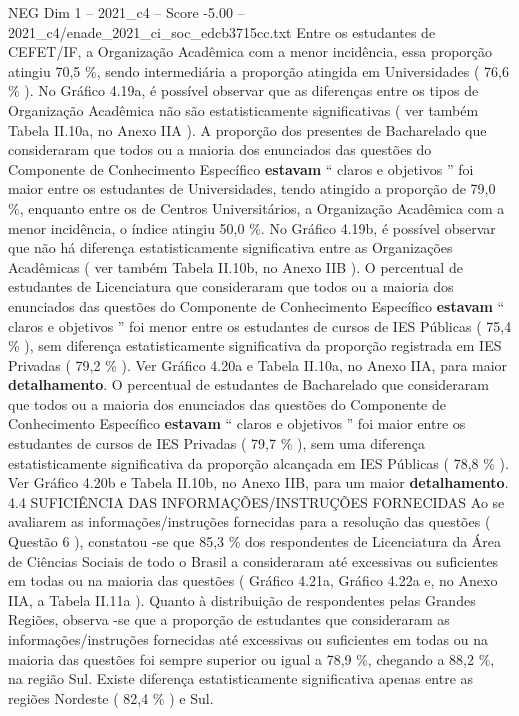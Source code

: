 \begin{textsample}{NEG Dim 1 – 2021\_c4 – Score -5.00 – 2021\_c4/enade\_2021\_ci\_soc\_edcb3715cc.txt}
Entre os estudantes de CEFET/IF, a Organização Acadêmica com a menor incidência, essa proporção atingiu 70,5 \%, sendo intermediária a proporção atingida em Universidades ( 76,6 \% ).
No Gráfico 4.19a, é possível observar que as diferenças entre os tipos de Organização Acadêmica não são estatisticamente significativas ( ver também Tabela II.10a, no Anexo IIA ).
A proporção dos presentes de Bacharelado que consideraram que todos ou a maioria dos enunciados das questões do Componente de Conhecimento Específico \textbf{estavam} “ claros e objetivos ” foi maior entre os estudantes de Universidades, tendo atingido a proporção de 79,0 \%, enquanto entre os de Centros Universitários, a Organização Acadêmica com a menor incidência, o índice atingiu 50,0 \%.
No Gráfico 4.19b, é possível observar que não há diferença estatisticamente significativa entre as Organizações Acadêmicas ( ver também Tabela II.10b, no Anexo IIB ).
O percentual de estudantes de Licenciatura que consideraram que todos ou a maioria dos enunciados das questões do Componente de Conhecimento Específico \textbf{estavam} “ claros e objetivos ” foi menor entre os estudantes de cursos de IES Públicas ( 75,4 \% ), sem diferença estatisticamente significativa da proporção registrada em IES Privadas ( 79,2 \% ).
Ver Gráfico 4.20a e Tabela II.10a, no Anexo IIA, para maior \textbf{detalhamento}.
O percentual de estudantes de Bacharelado que consideraram que todos ou a maioria dos enunciados das questões do Componente de Conhecimento Específico \textbf{estavam} “ claros e objetivos ” foi maior entre os estudantes de cursos de IES Privadas ( 79,7 \% ), sem uma diferença estatisticamente significativa da proporção alcançada em IES Públicas ( 78,8 \% ).
Ver Gráfico 4.20b e Tabela II.10b, no Anexo IIB, para um maior \textbf{detalhamento}. 4.4 SUFICIÊNCIA DAS INFORMAÇÕES/INSTRUÇÕES FORNECIDAS Ao se avaliarem as informações/instruções fornecidas para a resolução das questões ( Questão 6 ), constatou -se que 85,3 \% dos respondentes de Licenciatura da Área de Ciências Sociais de todo o Brasil a consideraram até excessivas ou suficientes em todas ou na maioria das questões ( Gráfico 4.21a, Gráfico 4.22a e, no Anexo IIA, a Tabela II.11a ).
Quanto à distribuição de respondentes pelas Grandes Regiões, observa -se que a proporção de estudantes que consideraram as informações/instruções fornecidas até excessivas ou suficientes em todas ou na maioria das questões foi sempre superior ou igual a 78,9 \%, chegando a 88,2 \%, na região Sul.
Existe diferença estatisticamente significativa apenas entre as regiões Nordeste ( 82,4 \% ) e Sul.

\end{textsample}
